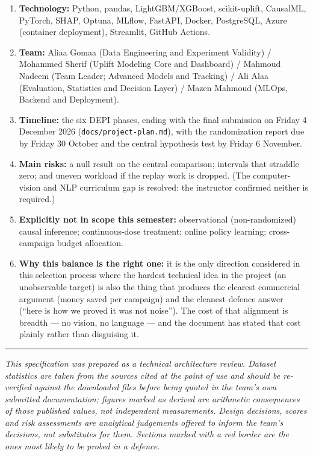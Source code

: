 \documentclass[11pt,a4paper]{article}
\begin{document}
\begin{keybox}
\begin{enumerate}
the MVP, with the X-learner favoured because of the 85/15 treatment imbalance; uplift forest and a
shared-representation neural estimator (time-boxed to one week) as challengers.
\item \textbf{Technology:} Python, pandas, LightGBM/XGBoost, scikit-uplift, CausalML, PyTorch,
SHAP, Optuna, MLflow, FastAPI, Docker, PostgreSQL, Azure (container deployment), Streamlit, GitHub
Actions.
\item \textbf{Team:} Aliaa Gomaa (Data Engineering and Experiment Validity) / Mohammed Sherif
(Uplift Modeling Core and Dashboard) / Mahmoud Nadeem (Team Leader; Advanced Models and
Tracking) / Ali Alaa (Evaluation, Statistics and Decision Layer) / Mazen Mahmoud (MLOps, Backend
and Deployment).
\item \textbf{Timeline:} the six DEPI phases, ending with the final submission on Friday 4 December
2026 (\texttt{docs/project-plan.md}), with the randomization report due by Friday 30 October and
the central hypothesis test by Friday 6 November.
\item \textbf{Main risks:} a null result on the central comparison; intervals that straddle zero;
and uneven workload if the replay work is dropped. (The computer-vision and NLP curriculum gap is
resolved: the instructor confirmed neither is required.)
\item \textbf{Explicitly not in scope this semester:} observational (non-randomized) causal
inference; continuous-dose treatment; online policy learning; cross-campaign budget allocation.
\item \textbf{Why this balance is the right one:} it is the only direction considered in this
selection process where the hardest technical idea in the project (an unobservable target) is also
the thing that produces the clearest commercial argument (money saved per campaign) and the
cleanest defence answer (``here is how we proved it was not noise''). The cost of that alignment is
breadth --- no vision, no language --- and the document has stated that cost plainly rather than
disguising it.
\end{enumerate}
\end{keybox}

\vspace{0.6cm}
\begin{center}\rule{0.5\textwidth}{0.4pt}\end{center}
\vspace{0.2cm}

{\small\itshape
This specification was prepared as a technical architecture review. Dataset statistics are taken
from the sources cited at the point of use and should be re-verified against the downloaded files
before being quoted in the team's own submitted documentation; figures marked as derived are
arithmetic consequences of those published values, not independent measurements. Design decisions,
scores and risk assessments are analytical judgements offered to inform the team's decisions, not
substitutes for them. Sections marked with a red border are the ones most likely to be probed in a
defence.}
\end{document}
